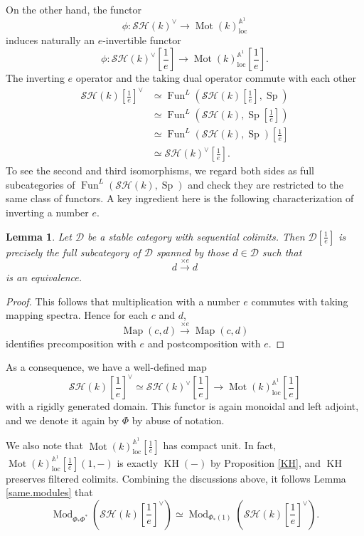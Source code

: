 \documentclass{article}
\newtheorem{lm}[thm]{Lemma}
\theoremstyle{definition}
\newcommand{\on}{\operatorname}
\begin{document}
On the other hand, the functor \[\phi: \mathcal{SH}(k)^\vee\rightarrow\on{Mot}(k)_{\on{loc}}^{\mathbb{A}^1}\] induces naturally an $e$-invertible functor \[\phi: \mathcal{SH}(k)^{\vee}[\frac{1}{e}]\rightarrow\on{Mot}(k)_{\on{loc}}^{\mathbb{A}^1}[\frac{1}{e}].\]
The inverting $e$ operator and the taking dual operator commute with each other\[
\begin{aligned}
\mathcal{SH}(k)[\frac{1}{e}]^{\vee}&\simeq\on{Fun}^L(\mathcal{SH}(k)[\frac{1}{e}],\on{Sp})\\
&\simeq\on{Fun}^L(\mathcal{SH}(k),\on{Sp}[\frac{1}{e}])\\
&\simeq\on{Fun}^L(\mathcal{SH}(k),\on{Sp})[\frac{1}{e}]\\
&\simeq\mathcal{SH}(k)^{\vee}[\frac{1}{e}].
\end{aligned}\]
To see the second and third isomorphisms, we regard both sides as full subcategories of $\on{Fun}^L(\mathcal{SH}(k),\on{Sp})$ and check they are restricted to the same class of functors. A key ingredient here is the following characterization of inverting a number $e$.
\begin{lm}
Let $\mathcal{D}$ be a stable category with sequential colimits. Then $\mathcal{D}[\frac{1}{e}]$ is precisely the full subcategory of $\mathcal{D}$ spanned by those $d\in\mathcal{D}$ such that \[d\xrightarrow{\times e}d\]
is an equivalence.
\end{lm}
\begin{proof}
This follows that multiplication with a number $e$ commutes with taking mapping spectra. Hence for each $c$ and $d$, \[\on{Map}(c,d)\xrightarrow{\times e}\on{Map}(c,d)\]
identifies precomposition with $e$ and postcomposition with $e$.
\end{proof}
As a consequence, we have a well-defined map\[
\mathcal{SH}(k)[\frac{1}{e}]^{\vee}\simeq\mathcal{SH}(k)^{\vee}[\frac{1}{e}]\rightarrow\on{Mot}(k)_{\on{loc}}^{\mathbb{A}^1}[\frac{1}{e}]\]
with a rigidly generated domain. This functor is again monoidal and left adjoint, and we denote it again by $\Phi$ by abuse of notation.


We also note that $\on{Mot}(k)_{\on{loc}}^{\mathbb{A}^1}[\frac{1}{e}]$ has compact unit. In fact, $\on{Mot}(k)_{\on{loc}}^{\mathbb{A}^1}[\frac{1}{e}](1,-)$ is exactly $\on{KH}(-)$ by Proposition \ref{KH}, and $\on{KH}$ preserves filtered colimits. Combining the discussions above, it follows Lemma \ref{same.modules} that\[
\on{Mod}_{\Phi_\ast\Phi^\ast}(\mathcal{SH}(k)[\frac{1}{e}]^\vee)\simeq\on{Mod}_{\Phi_\ast(1)}(\mathcal{SH}(k)[\frac{1}{e}]^\vee).
\]
\end{document}
